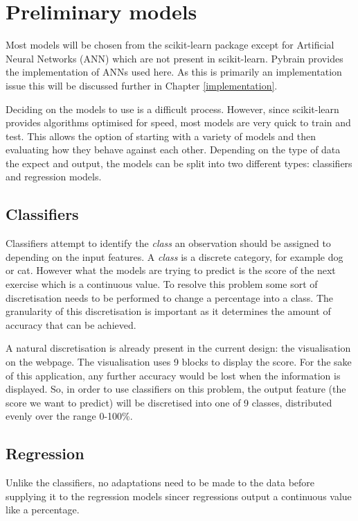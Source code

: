 \section{Preliminary models}
Most models will be chosen from the scikit-learn package except for Artificial Neural Networks (ANN) which are not present in scikit-learn. Pybrain provides the implementation of ANNs used here. As this is primarily an implementation issue this will be discussed further in Chapter \ref{implementation}.

Deciding on the models to use is a difficult process. However, since scikit-learn provides algorithms optimised for speed, most models are very quick to train and test. This allows the option of starting with a variety of models and then evaluating how they behave against each other. Depending on the type of data the expect and output, the models can be split into two different types: classifiers and regression models.

\subsection{Classifiers}
Classifiers attempt to identify the {\it class} an observation should be assigned to depending on the input features. A {\it class} is a discrete category, for example dog or cat. However what the models are trying to predict is the score of the next exercise which is a continuous value. To resolve this problem some sort of discretisation needs to be performed to change a percentage into a class. The granularity of this discretisation is important as it determines the amount of accuracy that can be achieved. 

A natural discretisation is already present in the current design: the visualisation on the webpage. The visualisation uses 9 blocks to display the score. For the sake of this application, any further accuracy would be lost when the information is displayed. So, in order to use classifiers on this problem, the output feature (the score we want to predict) will be discretised into one of 9 classes, distributed evenly over the range 0-100\%.

\subsection{Regression}
Unlike the classifiers, no adaptations need to be made to the data before supplying it to the regression models sincer regressions output a continuous value like a percentage.

